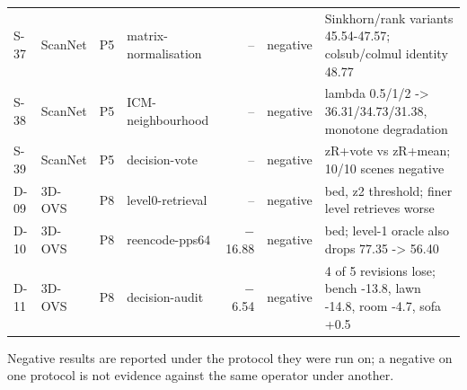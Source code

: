 \begin{table}[t]
\begin{tabular}{llllrlp{6.0cm}}
S-37 & ScanNet & P5 & matrix-normalisation & -- & negative & Sinkhorn/rank variants 45.54-47.57; colsub/colmul identity 48.77 \\
S-38 & ScanNet & P5 & ICM-neighbourhood & -- & negative & lambda 0.5/1/2 -> 36.31/34.73/31.38, monotone degradation \\
S-39 & ScanNet & P5 & decision-vote & -- & negative & zR+vote vs zR+mean; 10/10 scenes negative \\
D-09 & 3D-OVS & P8 & level0-retrieval & -- & negative & bed, z2 threshold; finer level retrieves worse \\
D-10 & 3D-OVS & P8 & reencode-pps64 & $-$16.88 & negative & bed; level-1 oracle also drops 77.35 -> 56.40 \\
D-11 & 3D-OVS & P8 & decision-audit & $-$6.54 & negative & 4 of 5 revisions lose; bench -13.8, lawn -14.8, room -4.7, sofa +0.5 \\
\bottomrule
\end{tabular}
\par\smallskip\footnotesize Negative results are reported under the protocol they were run on; a negative on one protocol is not evidence against the same operator under another.
\end{table}
